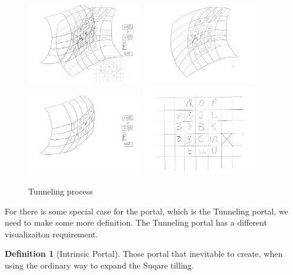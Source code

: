 \documentclass{article}
\theoremstyle{definition} %
\newtheorem{definition}{Definition}[section]
\begin{document}
\begin{figure}[!ht]
    \centering
    \includegraphics[width=0.45\textwidth]{figs/tunneling Portal.png}
    \includegraphics[width=0.45\textwidth]{figs/tunneling Portal0.png}
    \includegraphics[width=0.45\textwidth]{figs/tunneling Portal1.png}
    \includegraphics[width=0.45\textwidth]{figs/tunneling Portal tiling.png}
    \caption{Tunneling process}
    \label{fig:Tunneling}
\end{figure}

For there is some special case for the portal,
which is the Tunneling portal,
we need to make some more definition.
The Tunneling portal has a different visualizaiton
requirement.

\begin{definition}[Intrinsic Portal]
    \label{def:IntrinsicPortal}
    Those portal that inevitable to create,
    when using the ordinary way to expand
    the Suqare tilling.
\end{definition}
\end{document}
